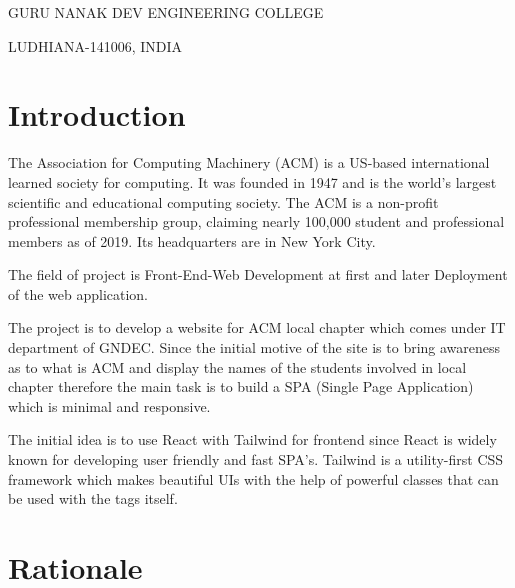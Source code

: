 \documentclass[english]{article}
\begin{document}
\begin{center}
GURU NANAK DEV ENGINEERING COLLEGE
\par\end{center}

\begin{center}
LUDHIANA-141006, INDIA
\par\end{center}

\thispagestyle{empty} 

\newpage{}

\tableofcontents{}

\thispagestyle{empty} 

\newpage{}

\section{Introduction }

The Association for Computing Machinery (ACM) is a US-based international
learned society for computing. It was founded in 1947 and is the world's
largest scientific and educational computing society. The ACM is a
non-profit professional membership group, claiming nearly 100,000
student and professional members as of 2019. Its headquarters are
in New York City.

The field of project is Front-End-Web Development at first and later
Deployment of the web application. 

The project is to develop a website for ACM local chapter which comes
under IT department of GNDEC. Since the initial motive of the site
is to bring awareness as to what is ACM and display the names of the
students involved in local chapter therefore the main task is to build
a SPA (Single Page Application) which is minimal and responsive.

The initial idea is to use React with Tailwind for frontend since
React is widely known for developing user friendly and fast SPA\textquoteright s.
Tailwind is a utility-first CSS framework which makes beautiful UIs
with the help of powerful classes that can be used with the tags itself.

\quad{} 

\setcounter{page}{1}

\newpage{}

\section{Rationale}
\end{document}
